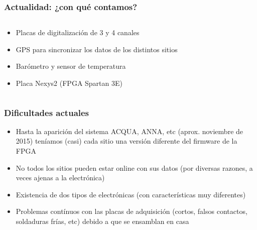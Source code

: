 \documentclass{beamer}
\begin{document}
\begin{frame}
	\frametitle{Actualidad: ¿con qué contamos?}
	\begin{columns}
		\begin{column}{0.40\textwidth}
			\begin{block}{}
	    	\begin{itemize}[<+->]
	      	\item Placas de digitalización de 3 y 4 canales
	      	\item GPS para sincronizar los datos de los 
								distintos sitios
	      	\item Barómetro y sensor de temperatura
					\item Placa Nexys2 (FPGA Spartan 3E)
	    	\end{itemize}
			\end{block}
		\end{column} 
	 	\begin{column}{0.55\textwidth}
	 \end{column}
	\end{columns}
\end{frame} 

\begin{frame}
	\frametitle{Dificultades actuales}
	\begin{alertblock}{}
		\begin{itemize}
		\item Hasta la aparición del sistema \alert{ACQUA}, \alert{ANNA}, etc
					(aprox. noviembre de 2015) teníamos (casi) cada sitio una versión
					diferente del \alert{firmware} de la FPGA 
		\item No todos los sitios pueden estar online con sus datos (por diversas
					razones, a veces ajenas a la electrónica)
		\item Existencia de dos tipos de electrónicas (con características muy
					diferentes)
		\item Problemas contínuos con las placas de adquisición (cortos, falsos
					contactos, soldaduras frías, etc) debido a que se ensamblan en casa
		\end{itemize}
	\end{alertblock}
\end{frame} 
\end{document}
